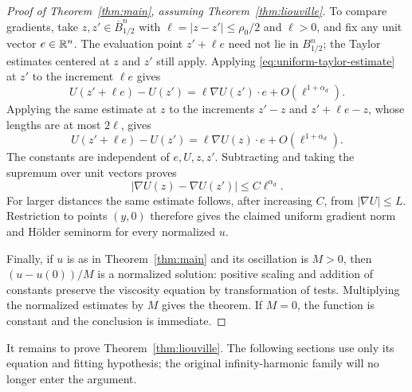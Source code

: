 \begin{proof}[Proof of Theorem~\ref{thm:main}, assuming Theorem~\ref{thm:liouville}]
To compare gradients, take $z,z'\in\overline B_{1/2}^n$ with $\ell=|z-z'|\le\rho_0/2$ and $\ell>0$, and fix any unit vector $e\in\mathbb{R}^n$. The evaluation point $z'+\ell e$ need not lie in $B_{1/2}^n$; the Taylor estimates centered at $z$ and $z'$ still apply. Applying \eqref{eq:uniform-taylor-estimate} at $z'$ to the increment $\ell e$ gives
\[
  U(z'+\ell e)-U(z')
       =\ell\nabla U(z')\cdot e+O(\ell^{1+\alpha_d}).
\]
Applying the same estimate at $z$ to the increments $z'-z$ and $z'+\ell e-z$, whose lengths are at most $2\ell$, gives
\[
  U(z'+\ell e)-U(z')
       =\ell\nabla U(z)\cdot e+O(\ell^{1+\alpha_d}).
\]
The constants are independent of $e,U,z,z'$. Subtracting and taking the supremum over unit vectors proves
\[
  |\nabla U(z)-\nabla U(z')|\le C\ell^{\alpha_d}.
\]
For larger distances the same estimate follows, after increasing $C$, from $|\nabla U|\le L$. Restriction to points $(y,0)$ therefore gives the claimed uniform gradient norm and H\"older seminorm for every normalized $u$.

Finally, if $u$ is as in Theorem~\ref{thm:main} and its oscillation is $M>0$, then $(u-u(0))/M$ is a normalized solution: positive scaling and addition of constants preserve the viscosity equation by transformation of tests. Multiplying the normalized estimates by $M$ gives the theorem. If $M=0$, the function is constant and the conclusion is immediate.
\end{proof}

It remains to prove Theorem~\ref{thm:liouville}. The following sections use only its equation and fitting hypothesis; the original infinity-harmonic family will no longer enter the argument.
